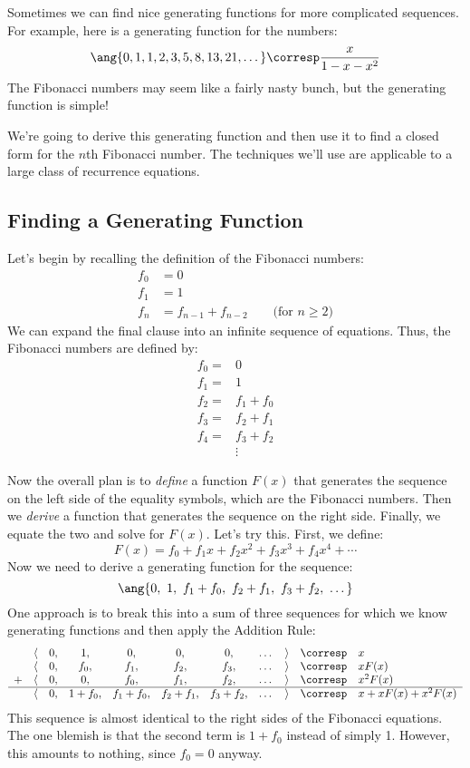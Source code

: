 Sometimes we can find nice generating functions for more complicated
sequences.  For example, here is a generating function for the
 numbers:
%
\[
\ang{0, 1, 1, 2, 3, 5, 8, 13, 21, \dots} \corresp \frac{x}{1-x-x^2}
\]
%
The Fibonacci numbers may seem like a fairly nasty bunch, but the
generating function is simple!

We're going to derive this generating function and then use it to find a
closed form for the $n$th Fibonacci number.  The techniques we'll use are
applicable to a large class of recurrence equations.

\subsection{Finding a Generating Function}

Let's begin by recalling the definition of the Fibonacci numbers:
%
\begin{align*}
f_0 & = 0 \\
f_1 & = 1 \\
f_n & = f_{n-1} + f_{n-2} \qquad \text{(for $n \geq 2$)}
\end{align*}
%
We can expand the final clause into an infinite sequence of equations.
Thus, the Fibonacci numbers are defined by:
%
\begin{align*}
f_0 = & 0 \\
f_1 = & 1 \\
f_2 = & f_1 + f_0 \\
f_3 = & f_2 + f_1 \\
f_4 = & f_3 + f_2 \\
      & \vdots
\end{align*}

Now the overall plan is to \emph{define} a function $F(x)$ that
generates the sequence on the left side of the equality symbols, which
are the Fibonacci numbers.  Then we \emph{derive} a function that
generates the sequence on the right side.  Finally, we equate the two
and solve for $F(x)$.  Let's try this.  First, we define:
%
\[
F(x) = f_0 + f_1 x + f_2 x^2 + f_3 x^3 + f_4 x^4 + \cdots
\]
%
Now we need to derive a generating function for the sequence:
%
\[
\ang{0,\ 1,\ f_1 + f_0,\ f_2 + f_1,\ f_3 + f_2,\ \dots}
\]
%
One approach is to break this into a sum of three sequences for which
we know generating functions and then apply the Addition Rule:
%
\[
\begin{array}{ccccccccccl}
  & \langle & 0, & 1, & 0, & 0, & 0, & \dots & \rangle
    & \corresp & x \\
  & \langle & 0, & f_0, & f_1, & f_2, & f_3, & \dots & \rangle
    & \corresp & x F(x) \\
+ & \langle & 0, & 0, & f_0, & f_1, & f_2, & \dots & \rangle
    & \corresp & x^2 F(x) \\ \hline
  & \langle & 0, & 1 + f_0, & f_1 + f_0, & f_2 + f_1, & f_3 + f_2, & \dots & \rangle
    & \corresp & x + x F(x) + x^2 F(x) \\
\end{array}
\]
%
This sequence is almost identical to the right sides of the Fibonacci
equations.  The one blemish is that the second term is $1 + f_0$
instead of simply 1.  However, this amounts to nothing, since $f_0 =
0$ anyway.

